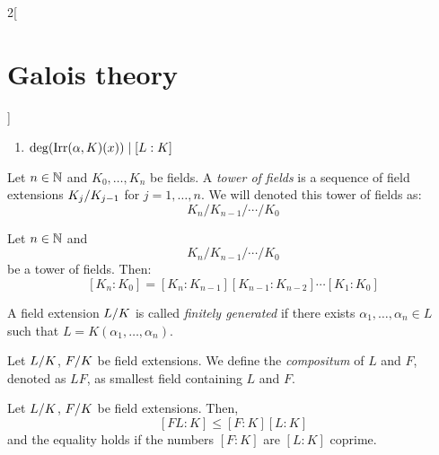 \documentclass[../../../main.tex]{subfiles}
\begin{document}
\begin{multicols}{2}[\section{Galois theory}]
\begin{prop}
\begin{enumerate}
      \item $\deg(\operatorname{Irr}(\alpha,K)(x))\mid [L:K]$
    \end{enumerate}
  \end{prop}
  \begin{definition}
    Let $n\in\mathbb{N}$ and $K_0,\ldots,K_n$ be fields. A \emph{tower of fields} is a sequence of field extensions $\quot{K_j}{K_{j-1}}$ for $j=1,\ldots,n$. We will denoted this tower of fields as: $$K_n/K_{n-1}/\cdots/K_0$$
  \end{definition}
  \begin{corollary}
    Let $n\in\mathbb{N}$ and $$K_n/K_{n-1}/\cdots/K_0$$ be a tower of fields. Then: $$[K_n:K_0]=[K_n:K_{n-1}][K_{n-1}:K_{n-2}]\cdots[K_1:K_0]$$
  \end{corollary}
  \begin{definition}
    A field extension $\quot{L}{K}$ is called \emph{finitely generated} if there exists $\alpha_1,\ldots,\alpha_n\in L$ such that $L=K(\alpha_1,\ldots,\alpha_n)$.
  \end{definition}
  \begin{definition}
    Let $\quot{L}{K}$, $\quot{F}{K}$ be field extensions. We define the \emph{compositum} of $L$ and $F$, denoted as $LF$, as smallest field containing $L$ and $F$.
  \end{definition}
  \begin{prop}
    Let $\quot{L}{K}$, $\quot{F}{K}$ be field extensions. Then, $$[FL:K]\leq[F:K][L:K]$$ and the equality holds if the numbers $[F:K]$ are $[L:K]$ coprime.
  \end{prop}

\end{multicols}
\end{document}
